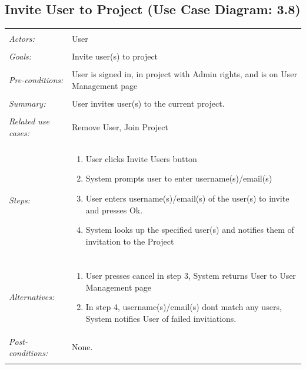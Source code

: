 \documentclass[11pt]{report}
\begin{document}
\subsection{Invite User to Project (Use Case Diagram: 3.8)}
\begin{tabular}{ p{2cm} p{12cm} }
    \hline
    \\
    \textit{Actors:} & User \\ 
    \\
    \textit{Goals:} & Invite user(s) to project \\
    \\
    \textit{Pre-conditions:} & User is signed in, in project with Admin rights, and is on User Management page \\
    \\
    \textit{Summary:} & User invites user(s) to the current project. \\ 
    \\
    \textit{Related use cases:} & Remove User, Join Project \\ 
    \\
    \textit{Steps:} & \begin{enumerate}
        \item User clicks Invite Users button
        \item System prompts user to enter username(s)/email(s)
        \item User enters username(s)/email(s) of the user(s) to invite and presses Ok.
        \item System looks up the specified user(s) and notifies them of invitation to the Project
    \end{enumerate} \\
    \\
    \textit{Alternatives:} & \begin{enumerate}
        \item User presses cancel in step 3, System returns User to User Management page
        \item In step 4, username(s)/email(s) don\'t match any users, System notifies User of failed invitiations.
    \end{enumerate} 
    \\
    \textit{Post-conditions:} & None. \\
    \\
    \hline
\end{tabular}
\end{document}
